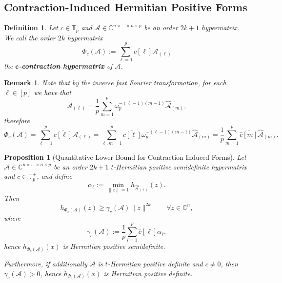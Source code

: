 \documentclass[11pt]{article}
\newtheorem{defn}[theorem]{Definition}
\newtheorem{proposition}[theorem]{Proposition}
\newtheorem{remark}[theorem]{Remark}
\begin{document}
\subsection{Contraction-Induced Hermitian Positive Forms}
\begin{defn}
    Let $c\in \mathbb{T}_p$ and $\mathcal{A}\in \mathbb{C}^{n\times\dots\times n\times p}$ be an order $2k+1$ hypermatrix. We call the order $2k$ hypermatrix
    \[\Phi_c(\mathcal{A}) := \sum\limits_{\ell=1}^p\overline{c[\ell]}\mathcal{A}_{(\ell)}\]
    the \textbf{$\boldsymbol{c}$-contraction hypermatrix} of $\mathcal{A}$. 
\end{defn}
\begin{remark}
    Note that by the inverse fast Fourier transformation, for each $\ell\in [p]$ we have that 
    \[\mathcal{A}_{(\ell)} = \frac{1}{p}\sum\limits_{m=1}^p\omega_p^{-(\ell-1)(m-1)}\widehat{\mathcal{A}}_{(m)},\]
    therefore
    \begin{equation}\label{contraction hypermatrix in frequency domain}
        \Phi_c(\mathcal{A}) = \sum\limits_{\ell=1}^p\overline{c[\ell]}\mathcal{A}_{(\ell)} = \sum\limits_{\ell,m=1}^p\overline{c[\ell]}\omega_p^{-(\ell-1)(m-1)}\widehat{\mathcal{A}}_{(m)} = \frac{1}{p}\sum\limits_{m=1}^p\overline{\widehat{c}[m]}\widehat{\mathcal{A}}_{(m)}.
    \end{equation}
\end{remark}
\begin{proposition}[Quantitative Lower Bound for Contraction Induced Forms]\label{Quantitative Lower Bound for Contraction Induced Forms}
    Let $\mathcal{A}\in \mathbb{C}^{n\times\dots\times n\times p}$ be an order $2k+1$ $t$-Hermitian positive semidefinite hypermatrix and $c\in \mathbb{T}_p^+$, and define 
    \[\alpha_{\ell} := \min\limits_{\|z\|=1}h_{\widehat{\mathcal{A}}_{(\ell)}}(z).\]
    Then \[h_{\Phi_c(\mathcal{A})}(z) \geq \gamma_c(\mathcal{A})\|z\|^{2k}\qquad \forall z\in \mathbb{C}^n,\]
    where 
    \[\gamma_c(\mathcal{A}) := \frac{1}{p}\sum\limits_{l=1}^p\widehat{c}[\ell]\alpha_{\ell},\]
    hence $h_{\Phi_c(\mathcal{A})}(x)$ is Hermitian positive semidefinite. 
    
    Furthermore, if additionally $\mathcal{A}$ is $t$-Hermitian positive definite and $c\neq 0$, then $\gamma_c(\mathcal{A}) > 0$, hence $h_{\Phi_c(\mathcal{A})}(x)$ is Hermitian positive definite. 
\end{proposition}
\end{document}
